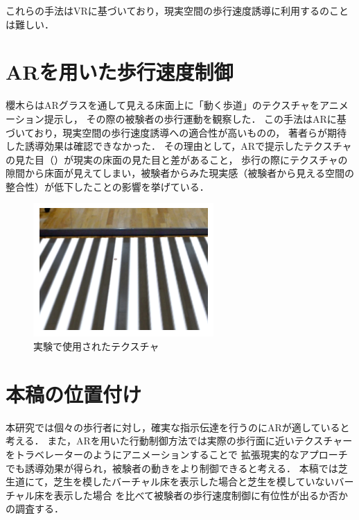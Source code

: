 これらの手法はVRに基づいており，現実空間の歩行速度誘導に利用するのことは難しい．

\section{ARを用いた歩行速度制御}
櫻木らはARグラスを通して見える床面上に「動く歩道」のテクスチャをアニメーション提示し，
その際の被験者の歩行運動を観察した\cite{sakura}．
この手法はARに基づいており，現実空間の歩行速度誘導への適合性が高いものの，
著者らが期待した誘導効果は確認できなかった．
その理由として，ARで提示したテクスチャの見た目（）が現実の床面の見た目と差があること，
歩行の際にテクスチャの隙間から床面が見えてしまい，被験者からみた現実感（被験者から見える空間の整合性）が低下したことの影響を挙げている．

\begin{figure}[H]
    \centering
    \includegraphics[clip, width=0.9\linewidth]{fig/8.PNG}
    \caption{実験で使用されたテクスチャ}
    \label{fig:8}
\end{figure}
\section{本稿の位置付け}
本研究では個々の歩行者に対し，確実な指示伝達を行うのにARが適していると考える．
また，ARを用いた行動制御方法では実際の歩行面に近いテクスチャーをトラベレーターのようにアニメーションすることで
拡張現実的なアプローチでも誘導効果が得られ，被験者の動きをより制御できると考える\cite{moto}．
本稿では芝生道にて，芝生を模したバーチャル床を表示した場合と芝生を模していないバーチャル床を表示した場合
を比べて被験者の歩行速度制御に有位性が出るか否かの調査する．